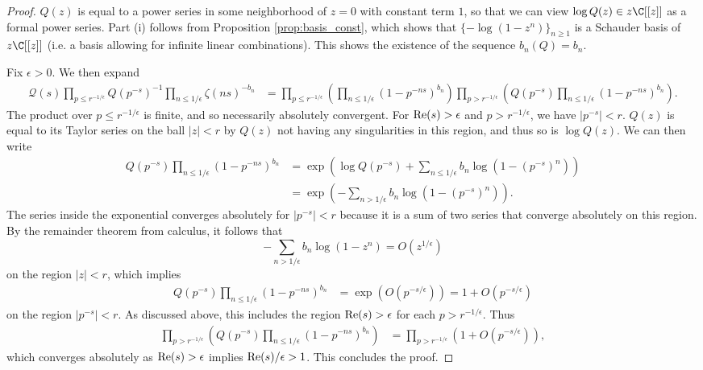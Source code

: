 \documentclass[12pt]{amsart}
\theoremstyle{plain}
\begin{document}
\begin{proof}
    $Q(z)$ is equal to a power series in some neighborhood of $z=0$ with constant term $1$, so that we can view $\log Q(z)\in z\C[[z]]$ as a formal power series. Part (i) follows from Proposition \ref{prop:basis_const}, which shows that $\{-\log(1-z^n)\}_{n\ge 1}$ is a Schauder basis of $z\C[[z]]$ (i.e. a basis allowing for infinite linear combinations). This shows the existence of the sequence $b_n(Q)=b_n$.

    Fix $\epsilon > 0$. We then expand
    \begin{align*}
        \mathcal{Q}(s) \prod_{p\le r^{-1/\epsilon}}Q(p^{-s})^{-1}\prod_{n\le 1/\epsilon}\zeta(ns)^{-b_n} &= \prod_{p\le r^{-1/\epsilon}}\left(\prod_{n\le 1/\epsilon}(1-p^{-ns})^{b_n}\right) \prod_{p> r^{-1/\epsilon}}\left(Q(p^{-s})\prod_{n\le 1/\epsilon}(1-p^{-ns})^{b_n}\right).
    \end{align*}
    The product over $p\le r^{-1/\epsilon}$ is finite, and so necessarily absolutely convergent. For ${\rm Re}(s) > \epsilon$ and $p>r^{-1/\epsilon}$, we have $|p^{-s}| < r$. $Q(z)$ is equal to its Taylor series on the ball $|z|<r$ by $Q(z)$ not having any singularities in this region, and thus so is $\log Q(z)$. We can then write
    \begin{align*}
        Q(p^{-s})\prod_{n\le 1/\epsilon}(1-p^{-ns})^{b_n} &= \exp\left(\log Q(p^{-s}) + \sum_{n\le 1/\epsilon} b_n\log(1-(p^{-s})^n)\right)\\
        &=\exp\left(-\sum_{n> 1/\epsilon} b_n\log(1-(p^{-s})^n)\right).
    \end{align*}
    The series inside the exponential converges absolutely for $|p^{-s}| < r$ because it is a sum of two series that converge absolutely on this region. By the remainder theorem from calculus, it follows that
    \[
        -\sum_{n> 1/\epsilon} b_n\log(1-z^n) = O(z^{1/\epsilon})
    \]
    on the region $|z|<r$, which implies
    \begin{align*}
        Q(p^{-s})\prod_{n\le 1/\epsilon}(1-p^{-ns})^{b_n} &= \exp\left(O(p^{-s/\epsilon})\right) = 1 + O(p^{-s/\epsilon})
    \end{align*}
    on the region $|p^{-s}| < r$. As discussed above, this includes the region ${\rm Re}(s) > \epsilon$ for each $p > r^{-1/\epsilon}$. Thus
    \begin{align*}
        \prod_{p>r^{-1/\epsilon}}\left(Q(p^{-s})\prod_{n\le 1/\epsilon}(1-p^{-ns})^{b_n}\right) &= \prod_{p>r^{-1/\epsilon}}\left(1 + O(p^{-s/\epsilon})\right),
    \end{align*}
    which converges absolutely as ${\rm Re}(s) > \epsilon$ implies ${\rm Re}(s)/\epsilon > 1$. This concludes the proof.
\end{proof}
\end{document}
